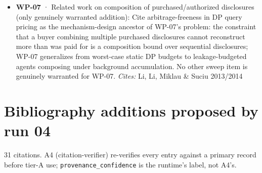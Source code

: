 \documentclass[
  11pt,
]{article}
\begin{document}
\begin{itemize}
  consent guarantees are end-run by inference as background data
  accumulates --- the canonical statement that a privacy guarantee's
  effective strength is a function of the evolving external data
  environment, which is exactly the erosion WP-04 formalizes.
  \emph{Cites:} Barocas \& Nissenbaum 2014
\item
  \textbf{WP-07} · Related work on composition of purchased/authorized
  disclosures (only genuinely warranted addition): Cite
  arbitrage-freeness in DP query pricing as the mechanism-design
  ancestor of WP-07's problem: the constraint that a buyer combining
  multiple purchased disclosures cannot reconstruct more than was paid
  for is a composition bound over sequential disclosures; WP-07
  generalizes from worst-case static DP budgets to leakage-budgeted
  agents composing under background accumulation. No other sweep item is
  genuinely warranted for WP-07. \emph{Cites:} Li, Li, Miklau \& Suciu
  2013/2014
\end{itemize}

\newpage

\section{Bibliography additions proposed by run
04}\label{bibliography-additions-proposed-by-run-04}

31 citations. A4 (citation-verifier) re-verifies every entry against a
primary record before tier-A use; \texttt{provenance\_confidence} is the
runtime's label, not A4's.
\end{document}
